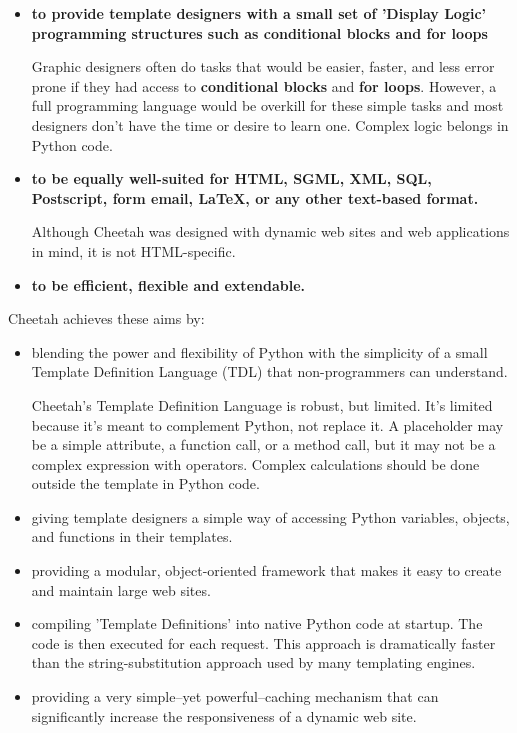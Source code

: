 \begin{itemize}
     
\item {\bf to provide template designers with a small set of 'Display Logic'
       programming structures such as conditional blocks and for loops}
     
     Graphic designers often do tasks that would be easier, faster, and less
     error prone if they had access to {\bf conditional blocks} and {\bf for
       loops}.  However, a full programming language would be overkill for these
     simple tasks and most designers don't have the time or desire to learn
     one. Complex logic belongs in Python code.
     
\item {\bf to be equally well-suited for HTML, SGML, XML, SQL, Postscript, form
       email, LaTeX, or any other text-based format.}
     
     Although Cheetah was designed with dynamic web sites and web applications
     in mind, it is not HTML-specific.
     
\item {\bf to be efficient, flexible and extendable.}
     
\end{itemize}

Cheetah achieves these aims by:

\begin{itemize}     
     
\item blending the power and flexibility of Python with the simplicity of a
     small Template Definition Language (TDL) that non-programmers can
     understand.
     
     Cheetah's Template Definition Language is robust, but limited.  It's
     limited because it's meant to complement Python, not replace it.  A
     placeholder may be a simple attribute, a function call, or a method call,
     but it may not be a complex expression with operators.  Complex
     calculations should be done outside the template in Python code.
     
\item giving template designers a simple way of accessing Python variables,
     objects, and functions in their templates.
     
\item providing a modular, object-oriented framework that makes it easy to
     create and maintain large web sites.
     
\item compiling 'Template Definitions' into native Python code at startup.  The
     code is then executed for each request.  This approach is dramatically
     faster than the string-substitution approach used by many templating
     engines.

\item providing a very simple--yet powerful--caching mechanism that can
     significantly increase the responsiveness of a dynamic web site.

\end{itemize}



